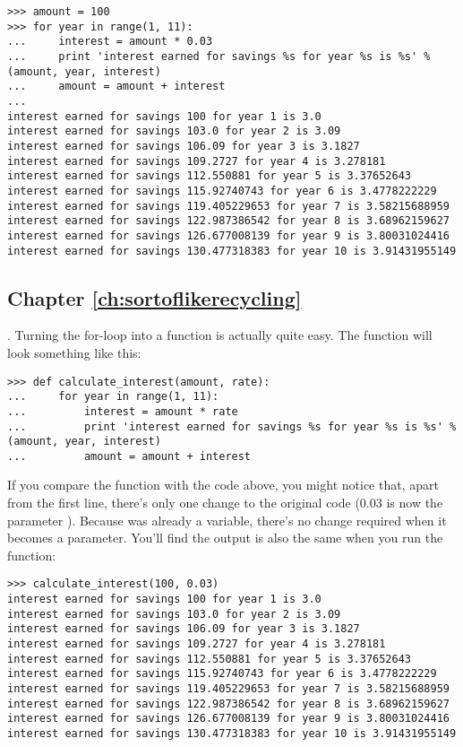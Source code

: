 \begin{listing}
\begin{verbatim}
>>> amount = 100
>>> for year in range(1, 11):
...     interest = amount * 0.03
...     print 'interest earned for savings %s for year %s is %s' % (amount, year, interest)
...     amount = amount + interest
... 
interest earned for savings 100 for year 1 is 3.0
interest earned for savings 103.0 for year 2 is 3.09
interest earned for savings 106.09 for year 3 is 3.1827
interest earned for savings 109.2727 for year 4 is 3.278181
interest earned for savings 112.550881 for year 5 is 3.37652643
interest earned for savings 115.92740743 for year 6 is 3.4778222229
interest earned for savings 119.405229653 for year 7 is 3.58215688959
interest earned for savings 122.987386542 for year 8 is 3.68962159627
interest earned for savings 126.677008139 for year 9 is 3.80031024416
interest earned for savings 130.477318383 for year 10 is 3.91431955149
\end{verbatim}
\end{listing}

\subsection*{Chapter \ref{ch:sortoflikerecycling}}

. Turning the for-loop into a function is actually quite easy.  The function will look something like this:

\begin{listing}
\begin{verbatim}
>>> def calculate_interest(amount, rate):
...     for year in range(1, 11):
...         interest = amount * rate
...         print 'interest earned for savings %s for year %s is %s' % (amount, year, interest)
...         amount = amount + interest
\end{verbatim}
\end{listing}

If you compare the function with the code above, you might notice that, apart from the first line, there's only one change to the original code (0.03 is now the parameter ). Because  was already a variable, there's no change required when it becomes a parameter. You'll find the output is also the same when you run the function:

\begin{listing}
\begin{verbatim}
>>> calculate_interest(100, 0.03)
interest earned for savings 100 for year 1 is 3.0
interest earned for savings 103.0 for year 2 is 3.09
interest earned for savings 106.09 for year 3 is 3.1827
interest earned for savings 109.2727 for year 4 is 3.278181
interest earned for savings 112.550881 for year 5 is 3.37652643
interest earned for savings 115.92740743 for year 6 is 3.4778222229
interest earned for savings 119.405229653 for year 7 is 3.58215688959
interest earned for savings 122.987386542 for year 8 is 3.68962159627
interest earned for savings 126.677008139 for year 9 is 3.80031024416
interest earned for savings 130.477318383 for year 10 is 3.91431955149
\end{verbatim}
\end{listing}

